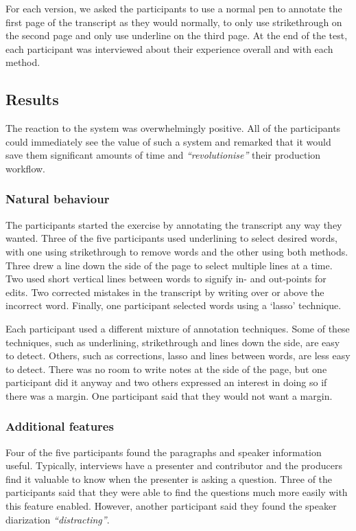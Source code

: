For each version, we asked the participants to use a normal pen to annotate the first page of the transcript as they
would normally, to only use strikethrough on the second page and only use underline on the third page. At the end of
the test, each participant was interviewed about their experience overall and with each method.

\subsection{Results}
The reaction to the system was overwhelmingly positive. All of the participants could immediately see the value of such
a system and remarked that it would save them significant amounts of time and \textit{``revolutionise''} their
production workflow.

\subsubsection{Natural behaviour}
The participants started the exercise by annotating the transcript any way they wanted.  Three of the five participants
used underlining to select desired words, with one using strikethrough to remove words and the other using both
methods.  Three drew a line down the side of the page to select multiple lines at a time.  Two used short vertical
lines between words to signify in- and out-points for edits.  Two corrected mistakes in the transcript by writing over
or above the incorrect word. Finally, one participant selected words using a `lasso' technique.

Each participant used a different mixture of annotation techniques. Some of these techniques, such as underlining,
strikethrough and lines down the side, are easy to detect.  Others, such as corrections, lasso and lines between words,
are less easy to detect. There was no room to write notes at the side of the page, but one participant did it anyway
and two others expressed an interest in doing so if there was a margin. One participant said that they would not want a
margin.

\subsubsection{Additional features}
Four of the five participants found the paragraphs and speaker information useful. Typically, interviews have a
presenter and contributor and the producers find it valuable to know when the presenter is asking a question.  Three of
the participants said that they were able to find the questions much more easily with this feature enabled. However,
another participant said they found the speaker diarization \textit{``distracting''}.

